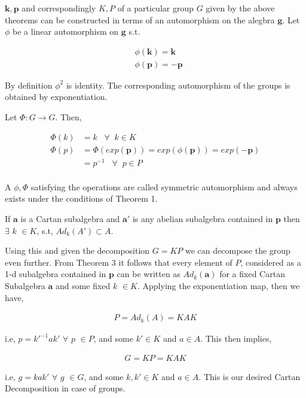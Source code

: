 $\mathbf{k},\mathbf{p}$ and correspondingly $K,P$ of a particular group $G$ given by the above theorems can be constructed in terms of an automorphism on the alegbra $\mathbf{g}$. Let $\phi$ be a linear automorphism on $\mathbf{g}$ s.t.

\begin{align*}
    &\phi(\mathbf{k})=\mathbf{k}
    \\ &\phi(\mathbf{p})= -\mathbf{p}
\end{align*}

By definition $\phi^2$ is identity. The corresponding automorphism of the groups is obtained by exponentiation.

Let $\Phi: G \rightarrow G$. Then,  

\begin{align*}
    \Phi(k) & = k \;\;\;\forall \;\;k \in K\\
    \Phi(p) & = \Phi(exp(\mathbf{p}))=exp(\phi(\mathbf{p}))=exp(-\mathbf{p}) \\
    & = p^{-1} \;\;\;\forall \;\;p \in P\\
\end{align*}

A $\phi, \Phi$ satisfying the operations are called symmetric automorphism and always exists under the conditions of Theorem 1.

\begin{thm}
If $\mathbf{a}$ is a Cartan subalgebra and $\mathbf{a'}$ is any abelian subalgebra contained in $\mathbf{p}$ then $\exists$ $k$ $\in K$, s.t, $Ad_k(A')\subset A$.
\end{thm}

Using this and given the decomposition $G=KP$ we can decompose the group even further. From Theorem 3 it follows that every element of $P$, considered as a 1-d subalgebra contained in $\mathbf{p}$ can be written as $Ad_k(\mathbf{a})$ for a fixed Cartan Subalgebra $\mathbf{a}$ and some fixed $k$ $\in K$. Applying the exponentiation map, then we have,

\begin{align*}
    P= Ad_k(A) = KAK
\end{align*}

i.e, $p=k'^{-1}ak'$ $\forall$ $p$ $\in P$, and some $k'\in K$ and $a \in A$. This then implies,

\begin{align*}
    G= KP = KAK
\end{align*}

i.e, $g=kak'$ $\forall$ $g$ $\in G$, and some $k,k'\in K$ and $a \in A$. This is our desired Cartan Decomposition in case of groups.



